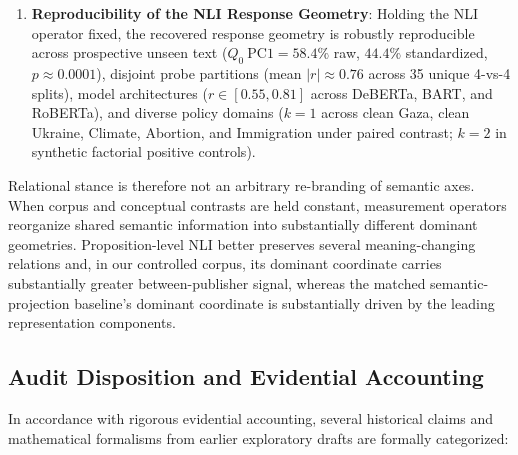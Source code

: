 \begin{enumerate}
    \item \textbf{Reproducibility of the NLI Response Geometry}: Holding the NLI operator fixed, the recovered response geometry is robustly reproducible across prospective unseen text ($Q_0\ \mathrm{PC1} = 58.4\%$ raw, $44.4\%$ standardized, $p \approx 0.0001$), disjoint probe partitions (mean $|r| \approx 0.76$ across 35 unique 4-vs-4 splits), model architectures ($r \in [0.55, 0.81]$ across DeBERTa, BART, and RoBERTa), and diverse policy domains ($k=1$ across clean Gaza, clean Ukraine, Climate, Abortion, and Immigration under paired contrast; $k=2$ in synthetic factorial positive controls).
\end{enumerate}

Relational stance is therefore not an arbitrary re-branding of semantic axes. When corpus and conceptual contrasts are held constant, measurement operators reorganize shared semantic information into substantially different dominant geometries. Proposition-level NLI better preserves several meaning-changing relations and, in our controlled corpus, its dominant coordinate carries substantially greater between-publisher signal, whereas the matched semantic-projection baseline's dominant coordinate is substantially driven by the leading representation components.

\subsection{Audit Disposition and Evidential Accounting}
\label{sec:audit_disposition}

In accordance with rigorous evidential accounting, several historical claims and mathematical formalisms from earlier exploratory drafts are formally categorized:

